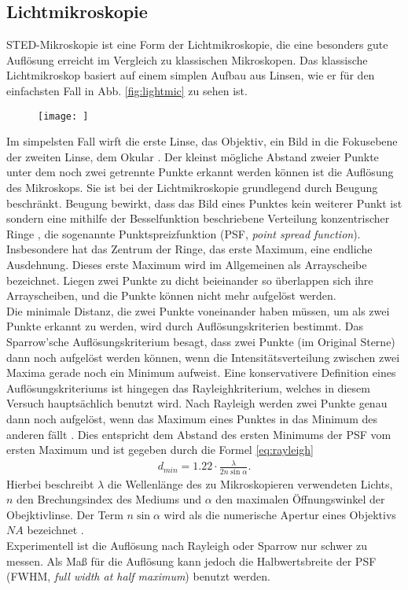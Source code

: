 \subsection{Lichtmikroskopie}
STED-Mikroskopie ist eine Form der Lichtmikroskopie, die eine besonders gute Auflösung erreicht im Vergleich zu klassischen Mikroskopen.
Das klassische Lichtmikroskop basiert auf einem simplen Aufbau aus Linsen, wie er für den einfachsten Fall in Abb. \ref{fig:lightmic} zu sehen ist.
\begin{figure}
	\centering
	\texttt{[image: ]}
\end{figure}
Im simpelsten Fall wirft die erste Linse, das Objektiv, ein Bild in die Fokusebene der zweiten Linse, dem Okular \cite{Dem2}.
Der kleinst mögliche Abstand zweier Punkte unter dem noch zwei getrennte Punkte erkannt werden können ist die Auflösung des Mikroskops.
Sie ist bei der Lichtmikroskopie grundlegend durch Beugung beschränkt.
Beugung bewirkt, dass das Bild eines Punktes kein weiterer Punkt ist sondern eine mithilfe der Besselfunktion beschriebene Verteilung konzentrischer Ringe \cite{Born}, die sogenannte Punktspreizfunktion (PSF, \emph{point spread function}).
Insbesondere hat das Zentrum der Ringe, das erste Maximum, eine endliche Ausdehnung.
Dieses erste Maximum wird im Allgemeinen als Arrayscheibe bezeichnet.
Liegen zwei Punkte zu dicht beieinander so überlappen sich ihre Arrayscheiben, und die Punkte können nicht mehr aufgelöst werden.\\
Die minimale Distanz, die zwei Punkte voneinander haben müssen, um als zwei Punkte erkannt zu werden, wird durch Auflösungskriterien bestimmt.
Das Sparrow'sche Auflösungskriterium \cite{sparrow} besagt, dass zwei Punkte (im Original Sterne) dann noch aufgelöst werden können, wenn die Intensitätsverteilung zwischen zwei Maxima gerade noch ein Minimum aufweist.
Eine konservativere Definition eines Auflösungskriteriums ist hingegen das Rayleighkriterium, welches in diesem Versuch hauptsächlich benutzt wird.
Nach Rayleigh werden zwei Punkte genau dann noch aufgelöst, wenn das Maximum eines Punktes in das Minimum des anderen fällt \cite{Dem2}.
Dies entspricht dem Abstand des ersten Minimums der PSF vom ersten Maximum und ist gegeben durch die Formel \ref{eq:rayleigh}
\begin{align}
	d_{min} = 1.22\cdot \frac{\lambda}{2n\sin \alpha}. \label{eq:rayleigh}
\end{align}
Hierbei beschreibt $\lambda$ die Wellenlänge des zu Mikroskopieren verwendeten Lichts, $n$ den Brechungsindex des Mediums und $\alpha$ den maximalen Öffnungswinkel der Obejktivlinse.
Der Term $n\sin\alpha$ wird als die numerische Apertur eines Objektivs $NA$ bezeichnet \cite{Born}.
\\
Experimentell ist die Auflösung nach Rayleigh oder Sparrow nur schwer zu messen. 
Als Maß für die Auflösung kann jedoch die Halbwertsbreite der PSF (FWHM, \emph{full width at half maximum}) benutzt werden. 
